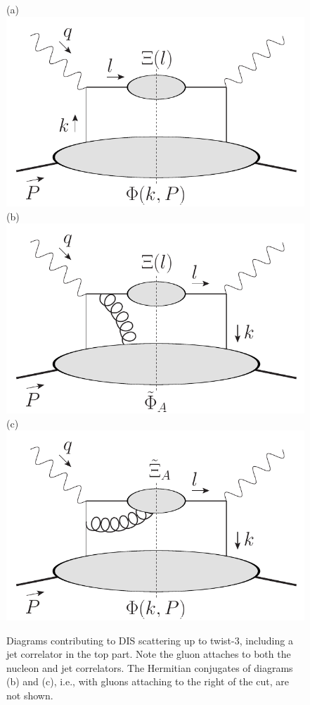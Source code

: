 \documentclass[preprintnumbers,floatfix,nofootinbib]{revtex4}
\begin{document}
\begin{figure}[bt]
  \centering
  (a)\includegraphics[width=0.3\linewidth,valign=t]{jetdiagram0}
  \hfill
  (b)\includegraphics[width=0.3\linewidth,valign=t]{jetdiagram2}
  \hfill
  (c)\includegraphics[width=0.3\linewidth,valign=t]{jetdiagram1}
  \caption{Diagrams contributing to DIS scattering up to twist-3, including a jet correlator in the top part. Note the gluon attaches to both the nucleon and jet correlators. The Hermitian conjugates of diagrams (b) and (c), i.e., with gluons attaching to the right of the cut, are not shown.
  }
  \label{fig:handbags}
\end{figure}
\end{document}
